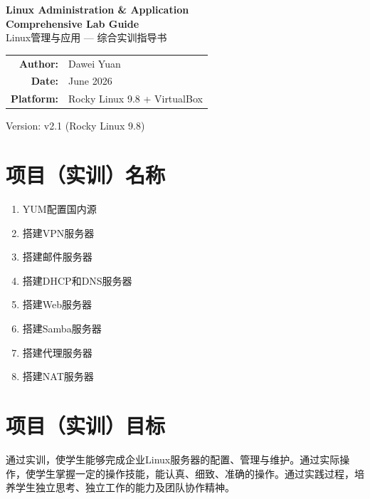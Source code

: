 \documentclass[12pt,a4paper]{ctexart}
\begin{document}
\begin{titlepage}
\begin{center}
\vspace*{3cm}

{\Huge\bfseries Linux Administration \& Application\\[8pt]Comprehensive Lab Guide}\\[14pt]
{\Large Linux管理与应用 --- 综合实训指导书}

\vspace{2cm}

\begin{tabular}{rl}
\textbf{Author:} & Dawei Yuan \\[8pt]
\textbf{Date:} & June 2026 \\[8pt]
\textbf{Platform:} & Rocky Linux 9.8 + VirtualBox
\end{tabular}

\vfill
{\small Version: v2.1 (Rocky Linux 9.8)}
\end{center}
\end{titlepage}

\newpage
\tableofcontents
\newpage

\section{项目（实训）名称}

\begin{enumerate}[label=\arabic*.,leftmargin=*]
  \item YUM配置国内源
  \item 搭建VPN服务器
  \item 搭建邮件服务器
  \item 搭建DHCP和DNS服务器
  \item 搭建Web服务器
  \item 搭建Samba服务器
  \item 搭建代理服务器
  \item 搭建NAT服务器
\end{enumerate}

\section{项目（实训）目标}

通过实训，使学生能够完成企业Linux服务器的配置、管理与维护。通过实际操作，使学生掌握一定的操作技能，能认真、细致、准确的操作。通过实践过程，培养学生独立思考、独立工作的能力及团队协作精神。
\end{document}
